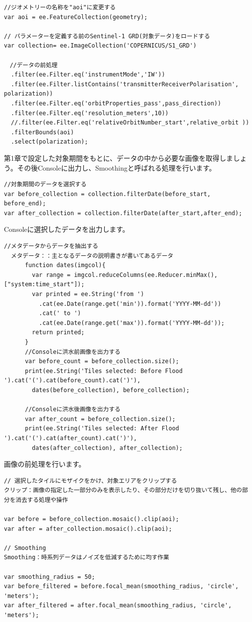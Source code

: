 \documentclass[
]{book}
\begin{document}
\begin{verbatim}
//ジオメトリーの名称を"aoi"に変更する 
var aoi = ee.FeatureCollection(geometry);    

// パラメーターを定義する前のSentinel-1 GRD(対象データ)をロードする
var collection= ee.ImageCollection('COPERNICUS/S1_GRD')

　//データの前処理
  .filter(ee.Filter.eq('instrumentMode','IW'))
  .filter(ee.Filter.listContains('transmitterReceiverPolarisation', polarization))
  .filter(ee.Filter.eq('orbitProperties_pass',pass_direction)) 
  .filter(ee.Filter.eq('resolution_meters',10))
  //.filter(ee.Filter.eq('relativeOrbitNumber_start',relative_orbit ))
  .filterBounds(aoi)
  .select(polarization);
\end{verbatim}

第1章で設定した対象期間をもとに、データの中から必要な画像を取得しましょう。その後Consoleに出力し、Smoothingと呼ばれる処理を行います。

\begin{verbatim}
//対象期間のデータを選択する
var before_collection = collection.filterDate(before_start, before_end);
var after_collection = collection.filterDate(after_start,after_end);
\end{verbatim}

Consoleに選択したデータを出力します。

\begin{verbatim}
//メタデータからデータを抽出する
  メタデータ：：主となるデータの説明書きが書いてあるデータ
      function dates(imgcol){
        var range = imgcol.reduceColumns(ee.Reducer.minMax(), ["system:time_start"]);
        var printed = ee.String('from ')
          .cat(ee.Date(range.get('min')).format('YYYY-MM-dd'))
          .cat(' to ')
          .cat(ee.Date(range.get('max')).format('YYYY-MM-dd'));
        return printed;
      }
      //Consoleに洪水前画像を出力する
      var before_count = before_collection.size();
      print(ee.String('Tiles selected: Before Flood ').cat('(').cat(before_count).cat(')'),
        dates(before_collection), before_collection);
      
      //Consoleに洪水後画像を出力する
      var after_count = before_collection.size();
      print(ee.String('Tiles selected: After Flood ').cat('(').cat(after_count).cat(')'),
        dates(after_collection), after_collection);
\end{verbatim}

画像の前処理を行います。

\begin{verbatim}
// 選択したタイルにモザイクをかけ、対象エリアをクリップする
クリップ：画像の指定した一部分のみを表示したり、その部分だけを切り抜いて残し、他の部分を消去する処理や操作

var before = before_collection.mosaic().clip(aoi);
var after = after_collection.mosaic().clip(aoi);

// Smoothing
Smoothing：時系列データはノイズを低減するために均す作業

var smoothing_radius = 50;
var before_filtered = before.focal_mean(smoothing_radius, 'circle', 'meters');
var after_filtered = after.focal_mean(smoothing_radius, 'circle', 'meters');
\end{verbatim}
\end{document}
